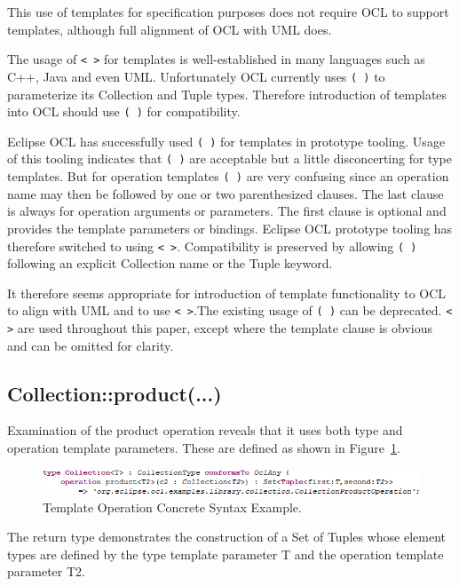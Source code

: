 \documentclass{eceasst}
\begin{document}
This use of templates for specification purposes does not require OCL to support templates, although full alignment of OCL with UML does.

The usage of \verb|< >| for templates is well-established in many languages such as C++, Java and even UML. Unfortunately OCL currently uses \verb|( )| to parameterize its Collection and Tuple types. Therefore introduction of templates into OCL should use \verb|( )| for compatibility.

Eclipse OCL has successfully used \verb|( )| for templates in prototype tooling. Usage of this tooling indicates that \verb|( )| are acceptable but a little disconcerting for type templates. But for operation templates \verb|( )| are very confusing since an operation name may then be followed by one or two parenthesized clauses. The last clause is always for operation arguments or parameters. The first clause is optional and provides the template parameters or bindings. Eclipse OCL prototype tooling has therefore switched to using \verb|< >|. Compatibility is preserved by allowing \verb|( )| following an explicit Collection name or the Tuple keyword.

It therefore seems appropriate for introduction of template functionality to OCL to align with UML and to use \verb|< >|.The existing usage of \verb|( )| can be deprecated. \verb|< >| are used throughout this paper, except where the template clause is obvious and can be omitted for clarity.  

\subsection{Collection::product(...)}

Examination of the product operation reveals that it uses both type and operation template parameters. These are defined as shown in Figure~\ref{fig:TemplateOperation}.

\begin{figure}
  \begin{center}
    \includegraphics[width=5.75in]{TemplateOperation.png}
  \end{center}
  \caption{Template Operation Concrete Syntax Example.}
  \label{fig:TemplateOperation}
\end{figure}

The return type demonstrates the construction of a Set of Tuples whose element types are defined by the type template parameter T and the operation template parameter T2.
\end{document}
